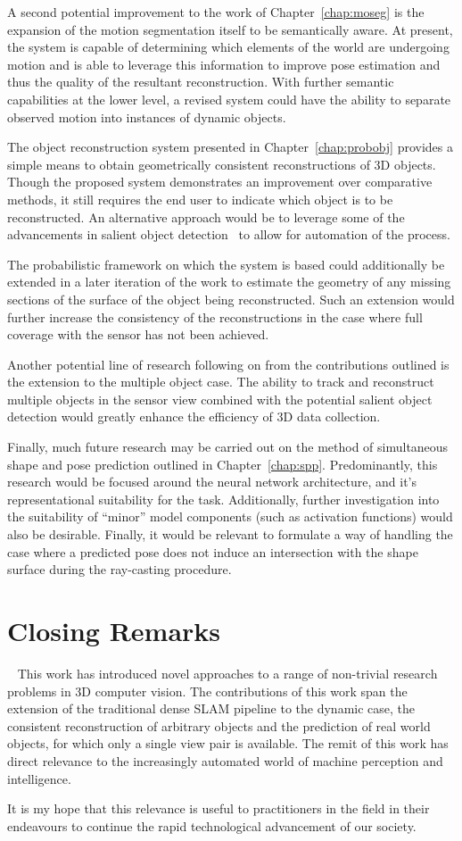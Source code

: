 A second potential improvement to the work of Chapter~\ref{chap:moseg} is the expansion of the 
motion segmentation itself to be semantically aware. At present, the system is capable of 
determining which elements of the world are undergoing motion and is able to leverage this 
information to improve pose estimation and thus the quality of the resultant reconstruction. 
With further semantic capabilities at the lower level, a revised system could have the ability 
to separate observed motion into instances of dynamic objects.

The object reconstruction system presented in Chapter~\ref{chap:probobj} provides a simple means 
to obtain geometrically consistent reconstructions of 3D objects. Though the proposed system
demonstrates an improvement over comparative methods, it still requires the end user to indicate 
which object is to be reconstructed. An alternative approach would be to leverage some of the 
advancements in salient object detection~\cite{Borji2014} to allow for automation of the process.

The probabilistic framework on which the system is based could additionally be extended in a later 
iteration of the work to estimate the geometry of any missing sections of the surface of the object 
being reconstructed. Such an extension would further increase the consistency of the reconstructions 
in the case where full coverage with the sensor has not been achieved.

Another potential line of research following on from the contributions outlined is the extension to 
the multiple object case. The ability to track and reconstruct multiple objects in the sensor view 
combined with the potential salient object detection would greatly enhance the efficiency of 3D data 
collection.

Finally, much future research may be carried out on the method of simultaneous shape and pose prediction 
outlined in Chapter~\ref{chap:spp}. Predominantly, this research would be focused around the neural network 
architecture, and it's representational suitability for the task. Additionally, further investigation into 
the suitability of ``minor'' model components (such as activation functions) would also be desirable. Finally, 
it would be relevant to formulate a way of handling the case where a predicted pose does not induce an intersection 
with the shape surface during the ray-casting procedure.

\section{Closing Remarks}
~\label{sec:discussion_conclusions}
This work has introduced novel approaches to a range of non-trivial research problems in 3D computer 
vision. The contributions of this work span the extension of the traditional dense SLAM pipeline to 
the dynamic case, the consistent reconstruction of arbitrary objects and the prediction of real world 
objects, for which only a single view pair is available. The remit of this work has direct relevance to 
the increasingly automated world of machine perception and intelligence.

It is my hope that this relevance is useful to practitioners in the field in their endeavours 
to continue the rapid technological advancement of our society.